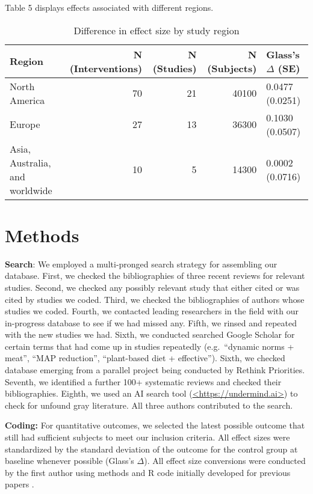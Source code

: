 \documentclass[sn-nature,pdflatex]{sn-jnl}
\begin{document}
Table 5 displays effects associated with different regions.

\begin{table}[!h]
\centering
\caption{\label{tab:tab:table_five}Difference in effect size by study region}
\centering
\begin{tabular}[t]{lrrrl}
\toprule
Region & N (Interventions) & N (Studies) & N (Subjects) & Glass's $\Delta$ (SE)\\
\midrule
North America & 70 & 21 & 40100 & 0.0477 (0.0251)\\
Europe & 27 & 13 & 36300 & 0.1030 (0.0507)\\
Asia, Australia, and worldwide & 10 & 5 & 14300 & 0.0002 (0.0716)\\
\bottomrule
\end{tabular}
\end{table}

\section{Methods}\label{sec3}

\textbf{Search}: We employed a multi-pronged search strategy for
assembling our database. First, we checked the bibliographies of three
recent reviews
\citep{mathur2021meta, bianchi2018conscious, bianchi2018restructuring}
for relevant studies. Second, we checked any possibly relevant study
that either cited or was cited by studies we coded. Third, we checked
the bibliographies of authors whose studies we coded. Fourth, we
contacted leading researchers in the field with our in-progress database
to see if we had missed any. Fifth, we rinsed and repeated with the new
studies we had. Sixth, we conducted searched Google Scholar for certain
terms that had come up in studies repeatedly (e.g.~``dynamic norms +
meat'', ``MAP reduction'', ``plant-based diet + effective''). Sixth, we
checked database emerging from a parallel project being conducted by
Rethink Priorities. Seventh, we identified a further 100+ systematic
reviews and checked their bibliographies. Eighth, we used an AI search
tool (\url{<https://undermind.ai>}) to check for unfound gray
literature. All three authors contributed to the search.

\textbf{Coding:} For quantitative outcomes, we selected the latest
possible outcome that still had sufficient subjects to meet our
inclusion criteria. All effect sizes were standardized by the standard
deviation of the outcome for the control group at baseline whenever
possible (Glass's \(\Delta\)). All effect size conversions were
conducted by the first author using methods and R code initially
developed for previous papers
\citep{paluck2019, paluck20201, porat2024}.
\end{document}
